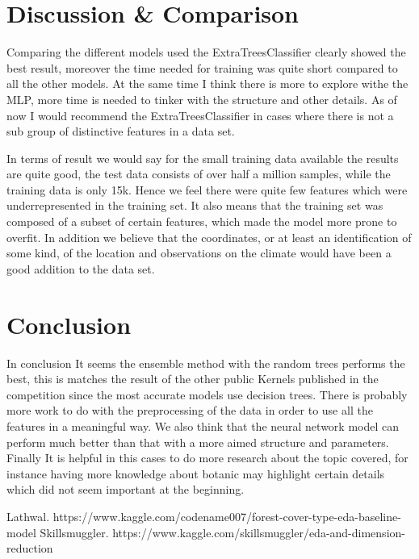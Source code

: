 \documentclass[a4paper, 11pt]{article}
\begin{document}
\section*{Discussion \& Comparison}
Comparing the different models used the ExtraTreesClassifier clearly showed the best result, moreover the time needed for training was quite short compared to all the other models. At the same time I think there is more to explore withe the MLP, more time is needed to tinker with the structure and other details. As of now I would recommend the ExtraTreesClassifier in cases where there is not a sub group of distinctive features in a data set.

In terms of result we would say for the small training data available the results are quite good, the test data consists of over half a million samples, while the training data is only 15k. Hence we feel there were quite few features which were underrepresented in the training set. It also means that the training set was composed of a subset of certain features, which made the model more prone to overfit. In addition we believe that the coordinates, or at least an identification of some kind, of the location and observations on the climate would have been a good addition to the data set.

\section*{Conclusion}
In conclusion It seems the ensemble method with the random trees performs the best, this is matches the result of the other public Kernels published in the competition since the most accurate models use decision trees. There is probably more work to do with the preprocessing of the data in order to use all the features in a meaningful way. We also think that the neural network model can perform much better than that with a more aimed structure and parameters. Finally It is helpful in this cases to do more research about the topic covered, for instance having more knowledge about botanic may highlight certain details which did not seem important at the beginning.

\begin{thebibliography}{9}
 Lathwal. https://www.kaggle.com/codename007/forest-cover-type-eda-baseline-model
 Skillsmuggler. https://www.kaggle.com/skillsmuggler/eda-and-dimension-reduction
\end{thebibliography}
\end{document}
